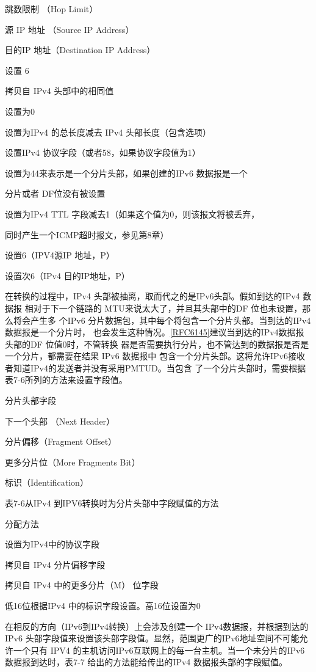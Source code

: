 跳数限制 （Hop Limit）

源 IP 地址 （Source IP Address）

目的IP 地址（Destination IP Address）

设置 6

拷贝自 IPv4 头部中的相同值

设置为0

设置为IPv4 的总长度减去 IPv4 头部长度（包含选项）

设置IPv4 协议字段（或者58，如果协议字段值为1）

设置为44来表示是一个分片头部，如果创建的IPv6 数据报是一个

分片或者 DF位没有被设置

设置为IPv4 TTL 字段减去1（如果这个值为0，则该报文将被丢弃，

同时产生一个ICMP超时报文，参见第8章）

设置6（IPV4源IP 地址，P）

设置次6（IPv4 目的IP地址，P）

在转换的过程中，IPv4 头部被抽离，取而代之的是IPv6头部。假如到达的IPv4 数据报
相对于下一个链路的 MTU来说太大了，并且其头部中的DF 位也未设置，那么将会产生多
个IPv6 分片数据包，其中每个将包含一个分片头部。当到达的IPv4数据报是一个分片时，
也会发生这种情况。\href{https://www.rfc-editor.org/rfc/rfc6145}{[RFC6145]}建议当到达的IPv4数据报头部的DF 位值0时，不管转换
器是否需要执行分片，也不管达到的数据报是否是一个分片，都需要在结果 IPv6 数据报中
包含一个分片头部。这将允许IPv6接收者知道IPv4的发送者并没有采用PMTUD。当包含
了一个分片头部时，需要根据表7-6所列的方法来设置字段值。

分片头部字段

下一个头部 （Next Header）

分片偏移（Fragment Offset）

更多分片位（More Fragments Bit）

标识（Identification）

表7-6从IPv4 到IPV6转换时为分片头部中字段赋值的方法

分配方法

设置为IPv4中的协议字段

拷贝自 IPv4 分片偏移字段

拷贝自 IPv4 中的更多分片（M） 位字段

低16位根据IPv4 中的标识字段设置。高16位设置为0

在相反的方向（IPv6到IPv4转换）上会涉及创建一个 IPv4数据报，并根据到达的IPv6
头部字段值来设置该头部字段值。显然，范围更广的IPv6地址空间不可能允许一个只有
IPV4 的主机访问IPv6互联网上的每一台主机。当一个未分片的IPv6 数据报到达时，表7-7
给出的方法能给传出的IPv4 数据报头部的字段赋值。

